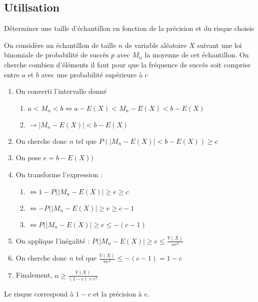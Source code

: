 \documentclass[french, logo]{yLectureNote}
\begin{document}
\subsection{Utilisation}
Déterminer une taille d'échantillon en fonction de la précision et du risque choisis

On considère un échantillon de taille $n$ de variable aléatoire $X$ suivant une loi binomiale de probabilité de succès $p$ avec $M_n$ la moyenne de cet échantillon. On cherche combien d'éléments il faut pour que la fréquence de succès soit comprise entre $a$ et $b$ avec une probabilité supérieure à $c$
\begin{enumerate}
 \item On converti l'intervalle donné \begin{enumerate}
                                       \item $a<M_n<b \iff a-E(X)<M_n-E(X)<b-E(X)$
                                       \item $\rightarrow |M_n-E(X)|<b-E(X)$
                                      \end{enumerate}
  \item On cherche donc $n$ tel que $P(|M_n-E(X)|<b-E(X)) \geq c$
  \item On pose $e = b-E(X))$
  \item On transforme l'expression :
  \begin{enumerate}
     \item $\iff 1-P(|M_n-E(X)|\geq e \geq c$
  \item $\iff -P(|M_n-E(X)|\geq e \geq c-1$
  \item $\iff P(|M_n-E(X)|\geq e \leq -(c-1)$
  \end{enumerate}
\item On applique l'inégalité : $ P(|M_n-E(X)|\geq e \leq \frac{V(X)}{ne^2}$
\item On cherche donc $n$ tel que $\frac{V(X)}{ne^2} \leq -(c-1) = 1-c$
\item Finalement, $n \geq \frac{V(X)}{(1-c)\times e^2}$

\end{enumerate}
Le risque correspond à $1-c$ et la précision à $e$.
\end{document}
